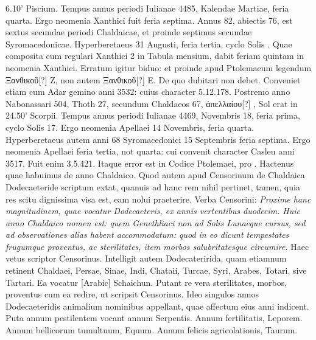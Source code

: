 6.10' Piscium.
Tempus annus periodi Iulianae %
 4485, Kalendae
Martiae, %
 feria quarta.
Ergo neomenia Xanthici fuit feria septima.
Annus
82, abiectis 76, est sextus secundae periodi Chaldaicae, et proinde
septimus secundae Syromacedonicae.
Hyperberetaeus 31 Augusti, feria
tertia, cyclo Solis .
Quae composita cum regulari Xanthici 2 in
Tabula mensium, dabit feriam quintam in neomenia Xanthici.
Erratum
igitur biduo: et proinde apud Ptolemaeum legendum \textgreek{Ξανθικοῦ[?]} Z,
non autem \textgreek{Ξανθικοῦ[?]} E.
De quo dubitari non debet.
Conveniet etiam
cum Adar gemino anni 3532: cuius character 5.12.178.
Postremo anno
Nabonassari 504, Thoth 27, secundum Chaldaeos 67, \textgreek{ἀπελλαίου[?]
 }, Sol erat in 24.50' Scorpii.
Tempus annus periodi Iulianae 4469,
Novembris 18, feria prima, cyclo Solis 17.
Ergo neomenia Apellaei 14
Novembris, feria quarta.
Hyperberetaeus autem anni 68 Syromacedonici
15 Septembris feria septima.
Ergo neomenia Apellaei feria tertia,
not quarta: cui convenit character Casleu anni 3517.
Fuit enim 3.5.421.
Itaque error est in Codice Ptolemaei,
 \textgreek{} pro \textgreek{}.
Hactenus quae habuimus
de anno Chaldaico.
Quod autem apud Censorinum de Chaldaica
Dodecaeteride scriptum extat, quanuis ad hanc rem nihil pertinet,
tamen, quia res scitu dignissima visa est, eam nolui praeterire.
Verba Censorini:
\textit{Proxime hanc magnitudinem, quae vocatur Dodecaeteris,
ex annis vertentibus duodecim.}
\textit{Huic anno Chaldaico nomen est: quem
Genethliaci non ad Solis Lunaeque cursus, sed ad observationes alias habent 
accommodatum: quod in eo dicunt tempestates frugumque proventus,
ac sterilitates, item morbos salubritatesque circumire.}
Haec %
 vetus scriptor
Censorinus.
Intelligit autem Dodecateririda, quam etiamnum retinent
Chaldaei, Persae, Sinae, %
 Indi, Chataii, Turcae, Syri, Arabes, Totari,
sive Tartari.
Ea vocatur \textarabic{}[Arabic] Schaichun.
Putant re vera sterilitates,
morbos, proventus cum ea redire, ut scripsit Censorinus. %
Ideo singulos
annos Dodecaeteridis animalium nominibus appellant, quae affectum
eius anni indicent.
Puta annum pestilentem vocant annum Serpentis.
Annum
fertilitatis, Leporem.
Annum bellicorum tumultuum, Equum.
Annum
felicis agricolationis, Taurum.
